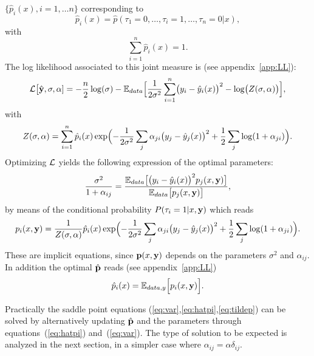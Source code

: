 \documentclass[envcountsect,runningheads]{llncs}
\theoremstyle{etoile}
\begin{document}
$\{\hat p_i(x),i=1,\dots n\}$ corresponding to
\[
\hat p_i(x) = \hat p(\tau_1=0,\ldots,\tau_i=1,\ldots,\tau_n=0\vert x),
\]
with 
\[
\sum_{i=1}^n \hat p_i(x) = 1.
\]
The log likelihood associated to this joint measure is (see appendix~\ref{app:LL}):
\begin{equation}\label{eq:LL}
{\cal L}\bigl[\hat {\bf y},\sigma,{\bf \alpha}] = -\frac{n}{2}\log(\sigma)-{\mathbb E}_{data}\Bigl[\frac{1}{2\sigma^2}\sum_{i=1}^n\bigl(y_i-\hat y_i(x)\bigr)^2
-\log\bigl(Z(\sigma,{\bf \alpha})\bigr)\Bigr],
\end{equation}
with
\[
Z(\sigma,{\bf \alpha}) = \sum_{i=1}^n\hat p_i(x)\exp\Bigl(-\frac{1}{2\sigma^2}\sum_j\alpha_{ji}\bigl(y_j-\hat y_j(x)\bigr)^2+\frac{1}{2}\sum_j\log(1+\alpha_{ji})\Bigr).
\]
Optimizing ${\cal L}$ yields the following expression of the optimal parameters:
\begin{equation}\label{eq:var}
\frac{\sigma^2}{1+\alpha_{ij}} = \frac{{\mathbb E}_{data}\bigl[\bigl(y_i-\hat y_i(x)\bigr)^2p_j(x,{\bf y})\bigr]}{{\mathbb E}_{data}\bigl[p_j(x,{\bf y})\bigr]},
\end{equation}
by means of the conditional probability $P(\tau_i=1\vert x,{\bf y})$ which reads
\begin{equation}\label{eq:hatpi}
p_i(x,{\bf y}) = \frac{1}{Z(\sigma,{\bf \alpha})}\hat p_i(x)\exp\Bigl(-\frac{1}{2\sigma^2}\sum_j\alpha_{ji}\bigl(y_j-\hat y_j(x)\bigr)^2+\frac{1}{2}\sum_j\log(1+\alpha_{ji})\Bigr).
\end{equation}
These are implicit equations, since ${\bf p}(x,{\bf y})$ depends on the parameters $\sigma^2$ and $\alpha_{ij}$.
In addition the optimal $\hat {\bf p}$ reads (see appendix~\ref{app:LL})
\begin{equation}\label{eq:tildep}
\hat p_i(x) = {\mathbb E}_{data,y}\Bigl[p_i(x,{\bf y})\Bigr].
\end{equation}

Practically the saddle point equations (\ref{eq:var},\ref{eq:hatpi},\ref{eq:tildep}) can be solved by alternatively updating $\hat {\bf p}$
and the parameters through equations~(\ref{eq:hatpi}) and~(\ref{eq:var}). The type of solution to be expected is analyzed in the next section,
in a simpler case where $\alpha_{ij} = \alpha\delta_{ij}$.
\end{document}
